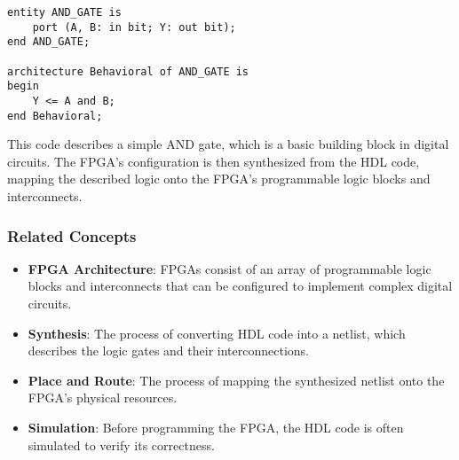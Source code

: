 \begin{verbatim}
entity AND_GATE is
    port (A, B: in bit; Y: out bit);
end AND_GATE;

architecture Behavioral of AND_GATE is
begin
    Y <= A and B;
end Behavioral;
\end{verbatim}

This code describes a simple AND gate, which is a basic building block in digital circuits. The FPGA's configuration is then synthesized from the HDL code, mapping the described logic onto the FPGA's programmable logic blocks and interconnects.

\subsubsection{Related Concepts}
\begin{itemize}
    \item \textbf{FPGA Architecture}: FPGAs consist of an array of programmable logic blocks and interconnects that can be configured to implement complex digital circuits.
    \item \textbf{Synthesis}: The process of converting HDL code into a netlist, which describes the logic gates and their interconnections.
    \item \textbf{Place and Route}: The process of mapping the synthesized netlist onto the FPGA's physical resources.
    \item \textbf{Simulation}: Before programming the FPGA, the HDL code is often simulated to verify its correctness.
\end{itemize}

